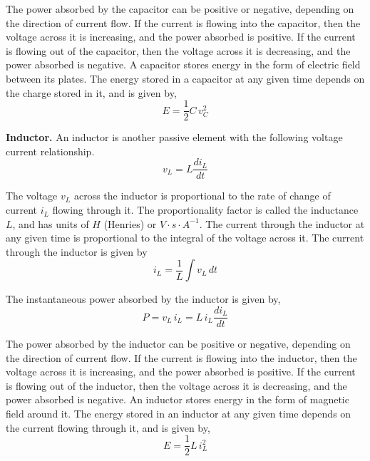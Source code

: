 The power absorbed by the capacitor can be positive or negative, depending on the direction of current flow. If the current is flowing into the capacitor, then the voltage across it is increasing, and the power absorbed is positive. If the current is flowing out of the capacitor, then the voltage across it is decreasing, and the power absorbed is negative. A capacitor stores energy in the form of electric field between its plates. The energy stored in a capacitor at any given time depends on the charge stored in it, and is given by,
\begin{equation}
    E = \frac{1}{2}  C \, v_C^2
    \label{eq:02-06}
\end{equation}

\noindent \textbf{Inductor.} An inductor is another passive element with the following voltage current relationship.
\begin{equation}
    v_L = L \frac{di_L}{dt}
    \label{eq:02-07}
\end{equation}

The voltage $v_L$ across the inductor is proportional to the rate of change of current $i_L$ flowing through it. The proportionality factor is called the inductance $L$, and has units of $H$ (Henries) or $V \cdot s \cdot A^{-1}$. The current through the inductor at any given time is proportional to the integral of the voltage across it. The current through the inductor is given by
\begin{equation}
    i_L = \frac{1}{L} \int v_L \, dt
    \label{eq:02-08}
\end{equation}

The instantaneous power absorbed by the inductor is given by,
\begin{equation}
    P = v_L \, i_L = L \, i_L \frac{di_L}{dt}
    \label{eq:02-09}
\end{equation}

The power absorbed by the inductor can be positive or negative, depending on the direction of current flow. If the current is flowing into the inductor, then the voltage across it is increasing, and the power absorbed is positive. If the current is flowing out of the inductor, then the voltage across it is decreasing, and the power absorbed is negative. An inductor stores energy in the form of magnetic field around it. The energy stored in an inductor at any given time depends on the current flowing through it, and is given by,
\begin{equation}
    E = \frac{1}{2}  L \, i_L^2
    \label{eq:02-10}
\end{equation}

